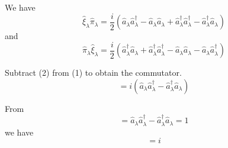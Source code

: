 


\bigskip
We have
\begin{equation*}
\hat\xi_\lambda\hat\pi_\lambda=\frac{i}{2}
\left(\hat a_\lambda\hat a_\lambda^\dag-\hat a_\lambda \hat a_\lambda
+\hat a_\lambda^\dag\hat a_\lambda^\dag-\hat a_\lambda^\dag\hat a_\lambda\right)
\tag{1}
\end{equation*}
and
\begin{equation*}
\hat\pi_\lambda\hat\xi_\lambda=\frac{i}{2}
\left(\hat a_\lambda^\dag\hat a_\lambda+\hat a_\lambda^\dag\hat a_\lambda^\dag
-\hat a_\lambda\hat a_\lambda-\hat a_\lambda\hat a_\lambda^\dag\right)
\tag{2}
\end{equation*}

Subtract (2) from (1) to obtain the commutator.
\begin{equation*}
[\hat\xi_\lambda,\hat\pi_\lambda]
=i\left(\hat a_\lambda\hat a_\lambda^\dag
-\hat a_\lambda^\dag\hat a_\lambda\right)
\end{equation*}

From
\begin{equation*}
[\hat a_\lambda,\hat a_\lambda^\dag]
=\hat a_\lambda\hat a_\lambda^\dag-\hat a_\lambda^\dag\hat a_\lambda=1
\end{equation*}
we have
\begin{equation*}
[\hat\xi_\lambda,\hat\pi_\lambda]=i
\end{equation*}


